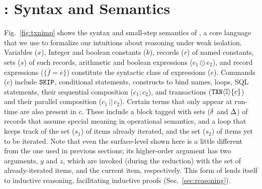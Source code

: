 \section{\txnimp: Syntax and Semantics}
\label{sec:opsem}

\label{sec:syntax}



Fig.~\ref{fig:txnimp} shows the syntax and small-step semantics of
\txnimp, a core language that we use to formalize our intuitions about
reasoning under weak isolation. Variables ($x$), Integer and boolean
constants ($k$), records ($r$) of named constants, sets ($s$) of such
records, arithmetic and boolean expressions ($e_1 \odot e_2$), and
record expressions ($\{\bar{f}=\bar{e}\}$) constitute the syntactic
class of expressions ($e$). Commands ($c$) include $\cskip$,
conditional statements,  constructs to bind names, 
loops, SQL statements, their sequential composition ($c_1;c_2$), and
transactions ($\ctxn{i}{\I}{c}$) and their parallel composition
($c_1\,||\,c_2$). Certain terms that only appear at run-time are also
present in $c$. These include a  block tagged with sets ($\stl$
and $\stg$) of records that assume special meaning in operational
semantics, and a  loop that keeps track of the set ($s_1$)
of items already iterated, and the set ($s_2$) of items yet to be
iterated. Note that even the surface-level  shown here is a
little different from the one used in previous sections; its
higher-order argument has two arguments, $y$ and $z$, which are
invoked (during the reduction) with the set of already-iterated items,
and the current item, respectively. This form of  lends
itself to inductive reasoning, facilitating inductive proofs
(Sec.~\ref{sec:reasoning}).


